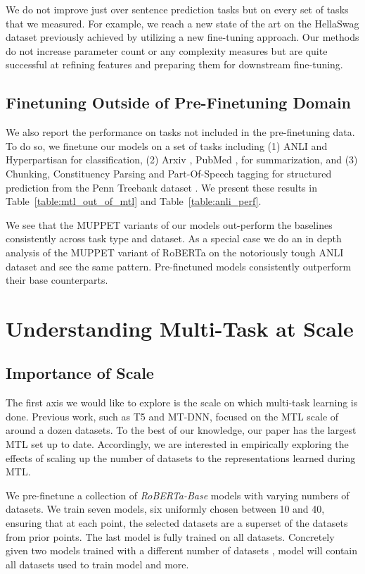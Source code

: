 \documentclass[11pt,a4paper]{article}
\begin{document}
We do not improve just over sentence prediction tasks but on every set of tasks that we measured. For example, we reach a new state of the art on the HellaSwag dataset previously achieved by utilizing a new fine-tuning approach. Our methods do not increase parameter count or any complexity measures but are quite successful at refining features and preparing them for downstream fine-tuning.

\subsection{Finetuning Outside of Pre-Finetuning Domain}
We also report the performance on tasks not included in the pre-finetuning data. To do so, we finetune our models on a set of tasks including (1) ANLI \cite{anli} and Hyperpartisan \cite{hyperpartisan} for classification, (2) Arxiv \cite{arxiv}, PubMed \cite{pubmed}, \cite{bigpatent} for summarization, and (3) Chunking, Constituency Parsing and Part-Of-Speech tagging for structured prediction from the Penn Treebank dataset \cite{penn}. We present these results in Table~\ref{table:mtl_out_of_mtl} and Table~\ref{table:anli_perf}.

We see that the MUPPET variants of our models out-perform the baselines consistently across task type and dataset. As a special case we do an in depth analysis of the MUPPET variant of RoBERTa on the notoriously tough ANLI dataset and see the same pattern. Pre-finetuned models consistently outperform their base counterparts.

\section{Understanding Multi-Task at Scale}
\label{sec:understanding_mtl}
\subsection{Importance of Scale}
\label{sec:scale_ablation}
The first axis we would like to explore is the scale on which multi-task learning is done. Previous work, such as T5 and MT-DNN, focused on the MTL scale of around a dozen datasets. To the best of our knowledge, our paper has the largest MTL set up to date. Accordingly, we are interested in empirically exploring the effects of scaling up the number of datasets to the representations learned during MTL.

We pre-finetune a collection of \textit{RoBERTa-Base} models with varying numbers of datasets. We train seven models, six uniformly chosen between 10 and 40, ensuring that at each point, the selected datasets are a superset of the datasets from prior points. The last model is fully trained on all datasets. Concretely given two models trained with a different number of datasets , model  will contain all datasets used to train model  and more.
\end{document}
